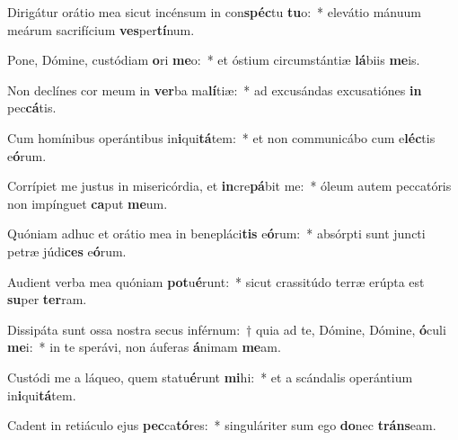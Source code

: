\item Dirigátur orátio mea sicut incénsum in con\textbf{spéc}tu \textbf{tu}o:~* elevátio mánuum meárum sacrifícium \textbf{ves}per\textbf{tí}num.
\item Pone, Dómine, custódiam \textbf{o}ri \textbf{me}o:~* et óstium circumstántiæ \textbf{lá}biis \textbf{me}is.
\item Non declínes cor meum in \textbf{ver}ba ma\textbf{lí}tiæ:~* ad excusándas excusatiónes \textbf{in} pec\textbf{cá}tis.
\item Cum homínibus operántibus in\textbf{i}qui\textbf{tá}tem:~* et non communicábo cum e\textbf{léc}tis e\textbf{ó}rum.
\item Corrípiet me justus in misericórdia, et \textbf{in}cre\textbf{pá}bit me:~* óleum autem peccatóris non impínguet \textbf{ca}put \textbf{me}um.
\item Quóniam adhuc et orátio mea in benepláci\textbf{tis} e\textbf{ó}rum:~* absórpti sunt juncti petræ júdi\textbf{ces} e\textbf{ó}rum.
\item Audient verba mea quóniam \textbf{pot}u\textbf{é}runt:~* sicut crassitúdo terræ erúpta est \textbf{su}per \textbf{ter}ram.
\item Dissipáta sunt ossa nostra secus inférnum:~† quia ad te, Dómine, Dómine, \textbf{ó}culi \textbf{me}i:~* in te sperávi, non áuferas \textbf{á}nimam \textbf{me}am.
\item Custódi me a láqueo, quem statu\textbf{é}runt \textbf{mi}hi:~* et a scándalis operántium in\textbf{i}qui\textbf{tá}tem.
\item Cadent in retiáculo ejus \textbf{pec}ca\textbf{tó}res:~* singuláriter sum ego \textbf{do}nec \textbf{tráns}eam.
